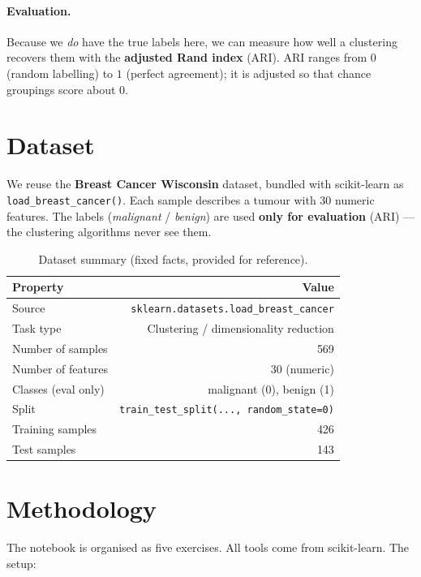 \documentclass[11pt,a4paper]{article}
\begin{document}
\paragraph{Evaluation.} Because we \emph{do} have the true labels here, we can
measure how well a clustering recovers them with the \textbf{adjusted Rand index}
(ARI). ARI ranges from $0$ (random labelling) to $1$ (perfect agreement); it is
adjusted so that chance groupings score about $0$.

\section{Dataset}
We reuse the \textbf{Breast Cancer Wisconsin} dataset, bundled with scikit-learn
as \lstinline|load_breast_cancer()|. Each sample describes a tumour with 30
numeric features. The labels (\emph{malignant} / \emph{benign}) are used
\textbf{only for evaluation} (ARI) — the clustering algorithms never see them.

\begin{table}[H]
\centering
\caption{Dataset summary (fixed facts, provided for reference).}
\label{tab:dataset}
\begin{tabular}{@{}lr@{}}
\toprule
\textbf{Property} & \textbf{Value} \\
\midrule
Source              & \lstinline|sklearn.datasets.load_breast_cancer| \\
Task type           & Clustering / dimensionality reduction \\
Number of samples   & 569 \\
Number of features  & 30 (numeric) \\
Classes (eval only) & malignant (0), benign (1) \\
Split               & \lstinline|train_test_split(..., random_state=0)| \\
Training samples    & 426 \\
Test samples        & 143 \\
\bottomrule
\end{tabular}
\end{table}

\section{Methodology}
The notebook is organised as five exercises. All tools come from scikit-learn.
The setup:
\end{document}
